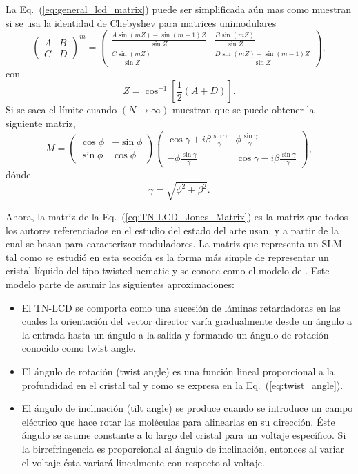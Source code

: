 La Eq.~(\ref{eq:general_lcd_matrix}) puede ser simplificada aún
mas como muestran  si se usa la identidad de Chebyshev
para matrices unimodulares  
\begin{equation}
  \begin{pmatrix}
    A & B \\ C & D
  \end{pmatrix}^m
=
\begin{pmatrix}
  \frac{A\sin{ (mZ) }-\sin(m-1)Z }{\sin{Z} }
  &\frac{B\sin{(mZ)}}{\sin{Z}}\\
\frac{C\sin{(mZ)}}{\sin{Z}}&   \frac{D\sin{ (mZ) }-\sin(m-1)Z }{\sin{Z} }
\end{pmatrix},
  \label{eq:chebyshev}
\end{equation}
con \[Z = \cos^{-1}{\left[\frac{1}{2}(A+D)\right]}.\]
Si se saca el límite cuando $(N\rightarrow \infty)$
 muestran que se puede obtener la
siguiente matriz,
\begin{equation}
  \label{eq:TN-LCD_Jones_Matrix}
  M=
  \begin{pmatrix}
    \cos{\phi} & -\sin{\phi}\\\sin{\phi}&\cos{\phi}
  \end{pmatrix}
  \begin{pmatrix}
    \cos{\gamma}+i\beta\frac{\sin{\gamma}}{\gamma} & \phi\frac{\sin{\gamma}}{\gamma}\\
-\phi\frac{\sin{\gamma}}{\gamma}   & \cos{\gamma}-i\beta\frac{\sin{\gamma}}{\gamma}
  \end{pmatrix},
\end{equation} 
dónde
\[\gamma=\sqrt{\phi^2+\beta^2}.\]

Ahora, la matriz de la Eq.~(\ref{eq:TN-LCD_Jones_Matrix})  es la
matriz que todos los autores referenciados en el
estudio del estado del arte usan, y a partir de la cual se basan
para caracterizar moduladores. La matriz que representa un
SLM  tal como se estudió en esta sección es la forma más
simple de representar un cristal líquido del tipo twisted nematic y se
conoce como el modelo de . Este modelo
parte de asumir las siguientes aproximaciones:

\begin{itemize}
\item El TN-LCD se comporta como una sucesión de  láminas
  retardadoras en las cuales la orientación del vector director varía
  gradualmente desde un ángulo a la entrada hasta un ángulo a la
  salida y formando un ángulo de rotación conocido como twist angle. 
\item El ángulo de rotación (twist angle) es una función lineal
  proporcional a la profundidad en el cristal tal y como se expresa en
  la Eq.~(\ref{eq:twist_angle}).
\item El ángulo de inclinación (tilt angle) se produce cuando se
  introduce un campo eléctrico que hace rotar las moléculas para
  alinearlas en su dirección. Éste ángulo se asume constante a lo
  largo del cristal para un voltaje específico. Si la birrefringencia
  es proporcional al ángulo de inclinación, entonces al variar el
  voltaje ésta variará linealmente con respecto al voltaje.
\end{itemize}

